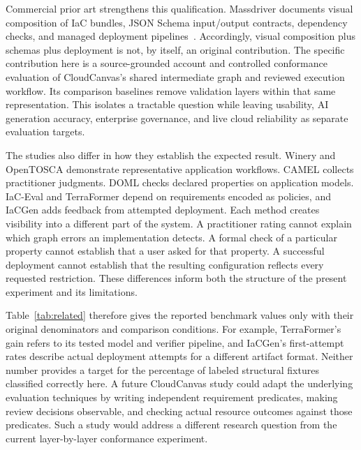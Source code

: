 Commercial prior art strengthens this qualification. Massdriver documents visual composition of IaC bundles, JSON Schema input/output contracts, dependency checks, and managed deployment pipelines~\cite{massdriver}. Accordingly, visual composition plus schemas plus deployment is not, by itself, an original contribution. The specific contribution here is a source-grounded account and controlled conformance evaluation of CloudCanvas's shared intermediate graph and reviewed execution workflow. Its comparison baselines remove validation layers within that same representation. This isolates a tractable question while leaving usability, AI generation accuracy, enterprise governance, and live cloud reliability as separate evaluation targets.


The studies also differ in how they establish the expected result. Winery and OpenTOSCA demonstrate representative application workflows. CAMEL collects practitioner judgments. DOML checks declared properties on application models. IaC-Eval and TerraFormer depend on requirements encoded as policies, and IaCGen adds feedback from attempted deployment. Each method creates visibility into a different part of the system. A practitioner rating cannot explain which graph errors an implementation detects. A formal check of a particular property cannot establish that a user asked for that property. A successful deployment cannot establish that the resulting configuration reflects every requested restriction. These differences inform both the structure of the present experiment and its limitations.

Table~\ref{tab:related} therefore gives the reported benchmark values only with their original denominators and comparison conditions. For example, TerraFormer's gain refers to its tested model and verifier pipeline, and IaCGen's first-attempt rates describe actual deployment attempts for a different artifact format. Neither number provides a target for the percentage of labeled structural fixtures classified correctly here. A future CloudCanvas study could adapt the underlying evaluation techniques by writing independent requirement predicates, making review decisions observable, and checking actual resource outcomes against those predicates. Such a study would address a different research question from the current layer-by-layer conformance experiment.
